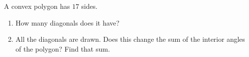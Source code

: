 A convex polygon has $17$ sides.
\begin{enumerate}
\item[(a)] How many diagonals does it have?
\item[(b)] All the diagonals are drawn. Does this change the sum of the interior angles of the polygon? Find that sum.
\end{enumerate}
